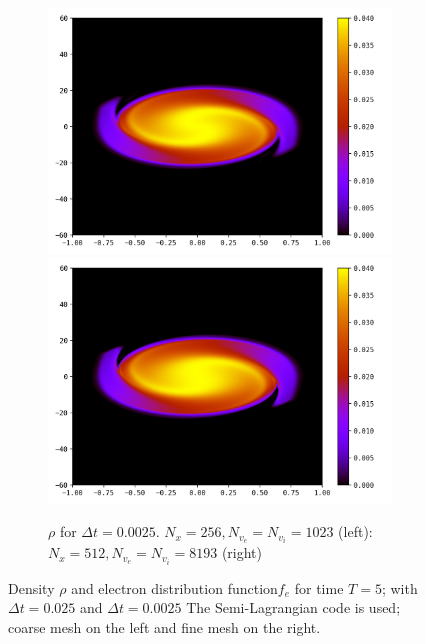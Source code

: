 \documentclass{article}
\numberwithin{equation}{section}
\newcommand{\mysubcaption}[1]{
	\vspace*{5pt}
	\begin{minipage}{0.8\linewidth}
		\begin{center}
			\footnotesize\emph{#1}
		\end{center}
	\end{minipage}
}
\newcommand{\imh}{\textheight} %
\begin{document}
\begin{figure}
	\begin{subfigure}{\textwidth}
		\centering
		\includegraphics[height=\imh,width=0.45\linewidth]{images/feT5_run5n.png}
		\includegraphics[height=\imh,width=0.45\linewidth]{images/feT5_run5z.png}
		\caption{$\rho$ for $\Delta t=0.0025$. $N_x=256, N_{v_e}=N_{v_i}=1023$ (left): $N_x=512  , N_{v_e}=N_{v_i} = 8193$ (right)}
	\end{subfigure}



	\caption{Density $\rho$ and electron distribution function$f_e$ for time $T=5$; with $\Delta t=0.025$ and $\Delta t = 0.0025$
	 The Semi-Lagrangian code is used; coarse mesh on the left and fine mesh on the right.
	}
	\label{fig:comp_temps2}
\end{figure}  
\end{document}
